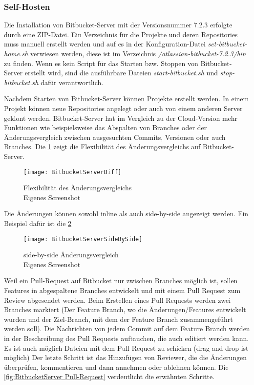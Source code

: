 \subsubsection{Self-Hosten}
\label{subsubsec:Bitbucket-self-host} 

Die Installation von Bitbucket-Server mit der Versionsnummer 7.2.3 erfolgte durch eine ZIP-Datei. Ein Verzeichnis für die Projekte und deren Repositories muss manuell erstellt werden und auf es in der Konfiguration-Datei \textit{set-bitbucket-home.sh} verwiesen werden, diese ist im Verzeichnis \textit{/atlassian-bitbucket-7.2.3/bin} zu finden. Wenn es kein Script für das Starten bzw. Stoppen von Bitbucket-Server erstellt wird, sind die ausführbare Dateien \textit{start-bitbucket.sh} und \textit{stop-bitbucket.sh} dafür verantwortlich.

Nachdem Starten von Bitbucket-Server können Projekte erstellt werden. In einem Projekt können neue Repositories angelegt oder auch von einem anderen Server geklont werden.
Bitbucket-Server hat im Vergleich zu der Cloud-Version mehr Funktionen wie beispielsweise das Abspalten von Branches oder der Änderungsvergleich zwischen ausgesuchten Commits, Versionen oder auch Branches. Die \cref{fig:Flexibilität des Änderungsvergleich} zeigt die Flexibilität des Änderungsvergleichs auf Bitbucket-Server.

\begin{figure}[H]
	\centering
	\texttt{[image: BitbucketServerDiff]}
	\caption[Flexibilität des Änderungsvergleichs auf Bitbucket-Server]{Flexibilität des Änderungsvergleichs \\Eigenes Screenshot}
	\label{fig:Flexibilität des Änderungsvergleich}
\end{figure}

Die Änderungen können sowohl inline als auch side-by-side angezeigt werden. Ein Beispiel dafür ist die \cref{fig:BitbucketServerSideBySide}

\begin{figure}[H]
	\centering
	\texttt{[image: BitbucketServerSideBySide]}
	\caption[Side-by-side Änderungsvergleich auf Bitbucket-Server]{side-by-side Änderungsvergleich\\Eigenes Screenshot}
	\label{fig:BitbucketServerSideBySide}
\end{figure}

Weil ein Pull-Request auf Bitbucket nur zwischen Branches möglich ist, sollen Features in abgespaltene Branches entwickelt und mit einem Pull Request zum Review abgesendet werden. Beim Erstellen eines Pull Requests werden zwei Branches markiert (Der Feature Branch, wo die Änderungen/Features entwickelt wurden und der Ziel-Branch, mit dem der Feature Branch zusammengeführt werden soll). Die Nachrichten von jedem Commit auf dem Feature Branch werden in der Beschreibung des Pull Requests auftauchen, die auch editiert werden kann. Es ist auch möglich Dateien mit dem Pull Request zu schicken (drag and drop ist möglich)
Der letzte Schritt ist das Hinzufügen von Reviewer, die die Änderungen überprüfen, kommentieren und dann annehmen oder ablehnen können. Die \cref{fig:BitbucketServer Pull-Request} verdeutlicht die erwähnten Schritte.

